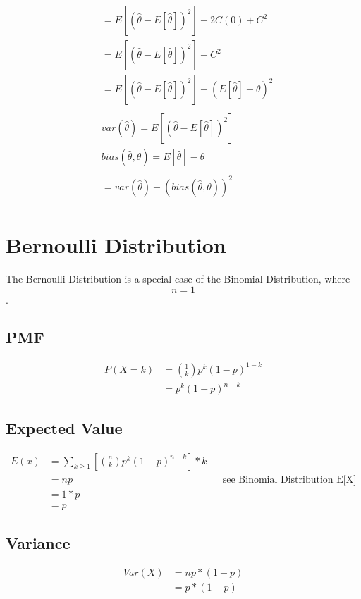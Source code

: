 \documentclass[]{book}
\begin{document}
\begin{align}
	&= E[(\hat{\theta} - E[\hat{\theta}])^2] + 2C(0) + C^2\\
	&= E[(\hat{\theta} - E[\hat{\theta}])^2] + C^2\\
	&= E[(\hat{\theta} - E[\hat{\theta}])^2] + (E[\hat{\theta}]  - \theta)^2\\	
	\\
	& var(\hat{\theta}) = E[(\hat{\theta} - E[\hat{\theta}])^2]\\
	& bias(\hat{\theta}, \theta) = E[\hat{\theta}]  - \theta\\
	\\
	&= var(\hat{\theta}) + (bias(\hat{\theta}, \theta))^2\\	
\end{align}

\section {Bernoulli Distribution}

The Bernoulli Distribution is a special case of the Binomial Distribution, where $$n=1$$.

\subsection{PMF}
\begin{align}
P(X=k) &= \binom{1} {k} p^k (1-p)^{1-k}\\
&=p^k (1-p)^{n-k}
\end{align}

\subsection {Expected Value}
\begin{align}
E(x) &= \sum_{k \geqslant 1} [\binom{n}{k} p^k (1-p)^{n-k}] * k\\
&= np && \text{see Binomial Distribution E[X]}\\
&= 1*p\\
&= p
\end{align}

\subsection {Variance}
\begin{align}
Var(X) &= np*(1-p)\\
&= p*(1-p)\\
\end{align}
\end{document}
